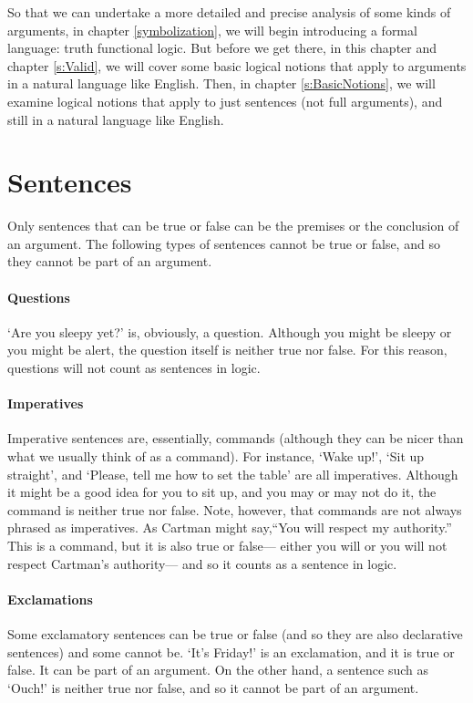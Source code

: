So that we can undertake a more detailed and precise analysis of some kinds of arguments, in chapter \ref{symbolization}, we will begin introducing a formal language: truth functional logic. But before we get there, in this chapter and chapter \ref{s:Valid}, we will cover some basic logical notions that apply to arguments in a natural language like English. Then, in chapter \ref{s:BasicNotions},  we will examine logical notions that apply to just sentences (not full arguments), and still in a natural language like English.


\section{Sentences}
\label{intro.sentences}

Only sentences that can be true or false can be the premises or the conclusion of an argument. The following types of sentences cannot be true or false, and so they cannot be part of an argument.

\paragraph{Questions} `Are you sleepy yet?' is, obviously, a question. Although you might be sleepy or you might be alert, the question itself is neither true nor false. For this reason, questions will not count as sentences in logic. 

\paragraph{Imperatives} Imperative sentences are, essentially, commands (although they can be nicer than what we usually think of as a command). For instance, `Wake up!', `Sit up straight', and `Please, tell me how to set the table' are all imperatives. Although it might be a good idea for you to sit up, and you may or may not do it, the command is neither true nor false. Note, however, that commands are not always phrased as imperatives.  As Cartman might say,``You will respect my authority.'' This is a command, but it is also true or false--- either you will or you will not respect Cartman's authority--- and so it counts as a sentence in logic.

\paragraph{Exclamations} Some exclamatory sentences can be true or false (and so they are also declarative sentences) and some cannot be. `It's Friday!' is an exclamation, and it is true or false. It can be part of an argument. On the other hand, a sentence such as `Ouch!' is neither true nor false, and so it cannot be part of an argument. 

